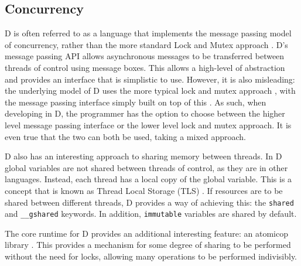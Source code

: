 \subsection{Concurrency}
D is often referred to as a language that implements the message passing model 
of concurrency, rather than the more standard Lock and Mutex approach 
\cite{ddili-book}. D's message passing API 
allows asynchronous messages to be transferred between threads of control using 
message boxes. This allows a high-level of abstraction and provides an 
interface that is simplistic to use. However, it is also misleading: the underlying 
model of D uses the more typical lock and mutex approach 
\cite{dlang-github-mutex}, 
with the message passing interface simply built on top of this 
\cite{dlang-github-concurrency}. 
As such, when developing in D, the programmer has the option to choose between 
the higher level message passing interface or the lower level lock and mutex 
approach. It is even true that the two can both be used, taking a mixed approach. 
\par\bigskip\noindent
D also has an interesting approach to sharing memory between threads. In D 
global variables are not shared between threads of control, as they are in 
other languages. Instead, each thread has a local copy of the global variable. 
This is a concept that is known as Thread Local Storage (TLS) 
\cite{migrate-to-shared}. 
If resources are to be shared between different threads, D provides a way of 
achieving this: the \texttt{shared} and \texttt{\_\_gshared} keywords. In addition, 
\texttt{immutable} variables are shared by default. 
\par\bigskip\noindent
The core runtime for D provides an additional interesting feature: an atomicop 
library 
\cite{core-atomic}. 
This provides a mechanism for some degree of sharing to be performed without the 
need for locks, allowing many operations to be performed indivisibly.


